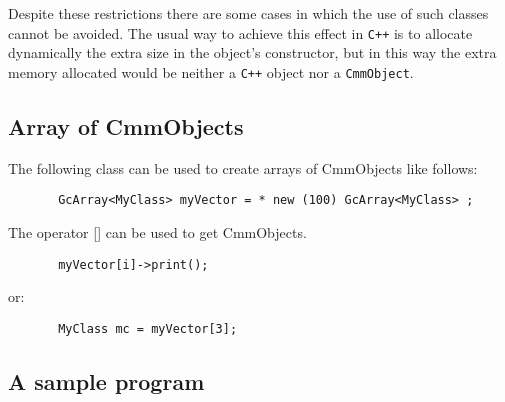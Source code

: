 Despite these restrictions there are some cases in which the use of such
classes cannot be avoided. The usual way to achieve this effect in {\tt C++}
is to allocate dynamically the extra size in the object's constructor, but in
this way the extra memory allocated would be neither a {\tt C++} object nor
a {\tt CmmObject}.

\subsection {Array of CmmObjects}

The following class can be used to create arrays of CmmObjects
like follows:

\begin{verbatim}
       GcArray<MyClass> myVector = * new (100) GcArray<MyClass> ;
\end{verbatim}
       
The operator [] can be used to get CmmObjects.

\begin{verbatim}
       myVector[i]->print();
\end{verbatim}
or:
\begin{verbatim}
       MyClass mc = myVector[3];
\end{verbatim}

\subsection{A sample program}

